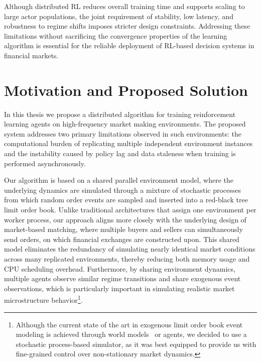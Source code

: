 Although distributed RL reduces overall training time and supports scaling to large actor populations,
the joint requirement of stability, low latency, and robustness to regime shifts imposes stricter design constraints.
Addressing these limitations without sacrificing the convergence properties of the learning algorithm is essential
for the reliable deployment of RL-based decision systems in financial markets.

\section{Motivation and Proposed Solution}
\label{sec:motivation}

In this thesis we propose a distributed algorithm for training reinforcement learning agents on high-frequency market making environments.
The proposed system addresses two primary limitations observed in such environments:
the computational burden of replicating multiple independent environment instances and the instability caused by
policy lag and data staleness when training is performed asynchronously.

Our algorithm is based on a shared parallel environment model, where the underlying dynamics are simulated
through a mixture of stochastic processes from which random order events are sampled and inserted into a red-black tree limit order book.
Unlike traditional architectures that assign one environment per worker process,
our approach aligns more closely with the underlying design of market-based matching,
where multiple buyers and sellers can simultaneously send orders, on which financial exchanges are constructed upon.
This shared model eliminates the redundancy of simulating nearly identical market conditions across many replicated environments,
thereby reducing both memory usage and CPU scheduling overhead.
Furthermore, by sharing environment dynamics, multiple agents observe similar regime transitions and share exogenous event observations,
which is particularly important in simulating realistic market microstructure behavior\footnote{
    Although the current state of the art in exogenous limit order book event modeling 
    is achieved through world models~\citep{Coletta2022} or agents,
    we decided to use a stochastic process-based simulator, 
    as it was best equipped to provide us with fine-grained control over non-stationary market dynamics.
}.

